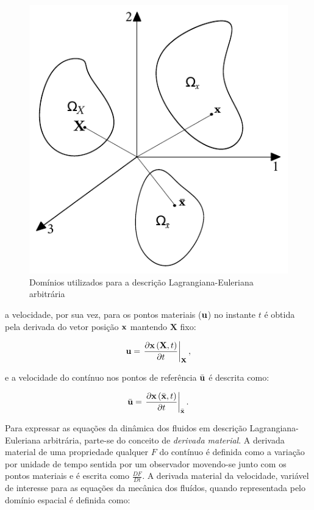 \documentclass[tese_patricia]{subfiles}%
\begin{document}
\begin{figure}[htb!]
	\centering
	\includegraphics[scale=1.0]{Imagens/Cap2/ALE.pdf}	
	\caption{Domínios utilizados para a descrição Lagrangiana-Euleriana arbitrária}
	\label{fig:Ale}
\end{figure}

\noindent a velocidade, por sua vez, para os pontos materiais ($\mathbf{u}$) no instante $t$ é obtida pela derivada do vetor posição $\mathbf{x}$ mantendo $\mathbf{X}$ fixo:

\begin{align}
\mathbf{u} = \left. \frac{\partial\mathbf{x}\left(\mathbf{X},t\right)}{\partial t} \right|_\mathbf{X}, \label{eq:vel}
\end{align}

\noindent e a velocidade do contínuo nos pontos de referência $\bar{\mathbf{u}}$ é descrita como:

\begin{align}
\bar{\mathbf{u}} = \left. \frac{\partial\mathbf{x}\left({\bar{\mathbf{x}}},t\right)}{\partial t} \right| _{\bar{\mathbf{x}}}. \label{eq:velALE}
\end{align}

Para expressar as equações da dinâmica dos fluidos em descrição Lagrangiana-Euleriana arbitrária, parte-se do conceito de \textit{derivada material}. A derivada material de uma propriedade qualquer $F$ do contínuo é definida como a variação por unidade de tempo sentida por um observador movendo-se junto com os pontos materiais e é escrita como $\frac{DF}{Dt}$. A derivada material da velocidade, variável de interesse para as equações da mecânica dos fluídos, quando representada pelo domínio espacial é definida como:
\end{document}
